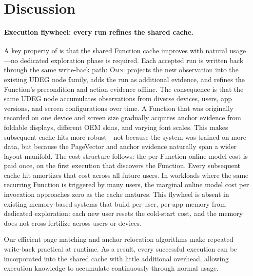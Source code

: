 
\section{Discussion}
\label{sec:discussion}

\paragraph{Execution flywheel: every run refines the shared cache.}
A key property of \sysname is that the shared Function cache improves with natural usage---no dedicated exploration phase is required.
Each accepted run is written back through the same write-back path: \textsc{Omni} projects the new observation into the existing UDEG node family, adds the run as additional evidence, and refines the Function's precondition and action evidence offline.
The consequence is that the same UDEG node accumulates observations from diverse devices, users, app versions, and screen configurations over time.
A Function that was originally recorded on one device and screen size gradually acquires anchor evidence from foldable displays, different OEM skins, and varying font scales.
This makes subsequent cache hits more robust---not because the system was trained on more data, but because the PageVector and anchor evidence naturally span a wider layout manifold.
The cost structure follows: the per-Function online model cost is paid once, on the first execution that discovers the Function.
Every subsequent cache hit amortizes that cost across all future users.
In workloads where the same recurring Function is triggered by many users, the marginal online model cost per invocation approaches zero as the cache matures.
This flywheel is absent in existing memory-based systems that build per-user, per-app memory from dedicated exploration: each new user resets the cold-start cost, and the memory does not cross-fertilize across users or devices.

Our efficient page matching and anchor relocation algorithms make repeated write-back practical at runtime. As a result, every successful execution can be incorporated into the shared cache with little additional overhead, allowing execution knowledge to accumulate continuously through normal usage.